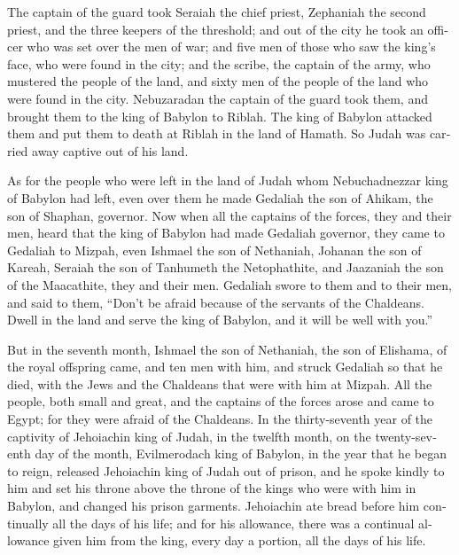 \begin{paracol}{2}
\begin{otherlanguage}{english}
 The captain of the guard took Seraiah the chief priest,
Zephaniah the second priest, and the three keepers of the threshold;
 and out of the city he took an officer who was set over
the men of war; and five men of those who saw the king's face, who were
found in the city; and the scribe, the captain of the army, who mustered
the people of the land, and sixty men of the people of the land who were
found in the city.  Nebuzaradan the captain of the guard
took them, and brought them to the king of Babylon to Riblah.
 The king of Babylon attacked them and put them to death
at Riblah in the land of Hamath. So Judah was carried away captive out
of his land.

 As for the people who were left in the land of Judah
whom Nebuchadnezzar king of Babylon had left, even over them he made
Gedaliah the son of Ahikam, the son of Shaphan, governor.
 Now when all the captains of the forces, they and their
men, heard that the king of Babylon had made Gedaliah governor, they
came to Gedaliah to Mizpah, even Ishmael the son of Nethaniah, Johanan
the son of Kareah, Seraiah the son of Tanhumeth the Netophathite, and
Jaazaniah the son of the Maacathite, they and their men. 
Gedaliah swore to them and to their men, and said to them, ``Don't be
afraid because of the servants of the Chaldeans. Dwell in the land and
serve the king of Babylon, and it will be well with you.''

 But in the seventh month, Ishmael the son of Nethaniah,
the son of Elishama, of the royal offspring came, and ten men with him,
and struck Gedaliah so that he died, with the Jews and the Chaldeans
that were with him at Mizpah.  All the people, both small
and great, and the captains of the forces arose and came to Egypt; for
they were afraid of the Chaldeans.  In the thirty-seventh
year of the captivity of Jehoiachin king of Judah, in the twelfth month,
on the twenty-seventh day of the month, Evilmerodach king of Babylon, in
the year that he began to reign, released Jehoiachin king of Judah out
of prison,  and he spoke kindly to him and set his throne
above the throne of the kings who were with him in Babylon,
 and changed his prison garments. Jehoiachin ate bread
before him continually all the days of his life;  and for
his allowance, there was a continual allowance given him from the king,
every day a portion, all the days of his life.
\end{otherlanguage} \end{paracol}
